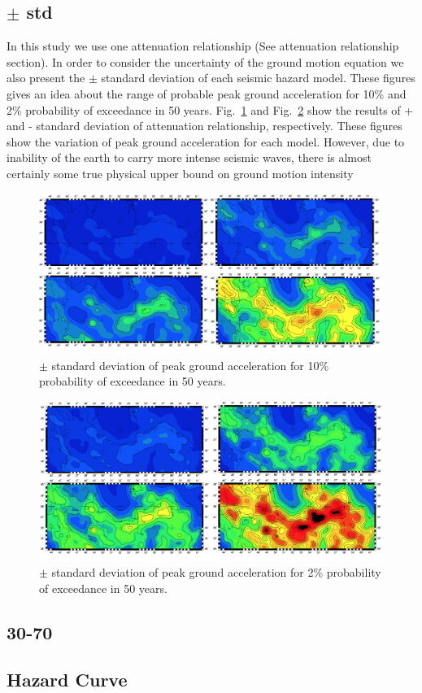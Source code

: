 









\subsection{$\pm$ std}
In this study we use one attenuation relationship (See attenuation relationship section). In order to consider the uncertainty of the ground motion equation we also present the $\pm$ standard deviation of each seismic hazard model. These figures gives an idea about the range of probable peak ground acceleration for 10\% and 2\% probability of exceedance in 50 years. Fig.~\ref{fig:pga_10_minus_plus} and Fig.~\ref{fig:pga_2_minus_plus} show the results of + and - standard deviation of attenuation relationship, respectively. These figures show the variation of peak ground acceleration for each model. However, due to inability of the earth to carry more intense seismic waves, there is almost certainly some true physical upper bound on ground motion intensity \citep{Baker2008}


\begin{figure} [!ht]
\centering
\includegraphics[scale=0.15]{figures/pdf/pga_10_minus_plus.pdf} 
\caption{$\pm$ standard deviation of peak ground acceleration for 10\% probability of exceedance in 50 years.}
\label{fig:pga_10_minus_plus}
\end{figure}


\begin{figure} [!ht]
\centering
\includegraphics[scale=0.15]{figures/pdf/pga_2_minus_plus.pdf} 
\caption{$\pm$ standard deviation of peak ground acceleration for 2\% probability of exceedance in 50 years.}
\label{fig:pga_2_minus_plus}
\end{figure}



\subsection{30-70}

\subsection{Hazard Curve}
